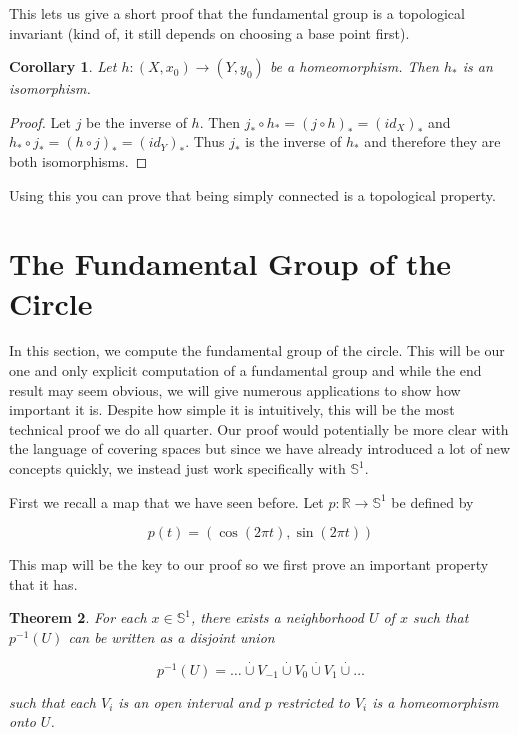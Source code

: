 \documentclass[a4paper]{article}
\newtheorem{theorem}{Theorem}
\newtheorem{corollary}[theorem]{Corollary}
\numberwithin{theorem}{section}
\begin{document}
This lets us give a short proof that the fundamental group is a topological invariant (kind of, it still depends on choosing a base point first).

\begin{corollary}
Let $h: (X,x_0) \rightarrow (Y,y_0)$ be a homeomorphism. Then $h_*$ is an isomorphism.
\end{corollary}

\begin{proof}
Let $j$ be the inverse of $h$. Then $j_* \circ h_* = (j \circ h)_* = (id_X)_*$ and $h_* \circ j_* = (h \circ j)_* = (id_Y)_*$. Thus $j_*$ is the inverse of $h_*$ and therefore they are both isomorphisms.

\end{proof}

Using this you can prove that being simply connected is a topological property.


\section{The Fundamental Group of the Circle}

In this section, we compute the fundamental group of the circle. This will be our one and only explicit computation of a fundamental group and while the end result may seem obvious, we will give numerous applications to show how important it is. Despite how simple it is intuitively, this will be the most technical proof we do all quarter. Our proof would potentially be more clear with the language of covering spaces but since we have already introduced a lot of new concepts quickly, we instead just work specifically with $\mathbb{S}^1$.

First we recall a map that we have seen before. Let $p: \mathbb{R} \rightarrow \mathbb{S}^1$ be defined by

$$ p(t) = (\cos(2\pi t), \sin(2 \pi t) ) $$

This map will be the key to our proof so we first prove an important property that it has.

\begin{theorem}
For each $x \in \mathbb{S}^1$, there exists a neighborhood $U$ of $x$ such that $p^{-1}(U)$ can be written as a disjoint union

$$ p^{-1}(U) = \dots \overset{\cdot}{\cup} V_{-1} \overset{\cdot}{\cup} V_0 \overset{\cdot}{\cup} V_1 \overset{\cdot}{\cup} \dots  $$

such that each $V_i$ is an open interval and $p$ restricted to $V_i$ is a homeomorphism onto $U$.
\end{theorem}
\end{document}
